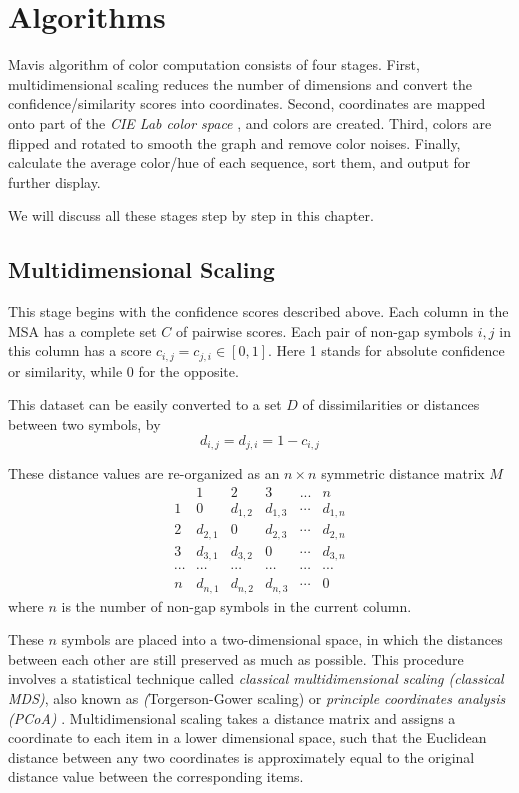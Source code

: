 \chapter{Algorithms}\label{chap:Algorithms}

Mavis algorithm of color computation consists of four stages. First, multidimensional scaling reduces the number of dimensions and convert the confidence/similarity scores into coordinates. Second, coordinates are mapped onto part of the \emph{CIE Lab color space} \cite {McLAREN:1976aa}, and colors are created. Third, colors are flipped and rotated to smooth the graph and remove color noises. Finally, calculate the average color/hue of each sequence, sort them, and output for further display.

We will discuss all these stages step by step in this chapter.

\section{Multidimensional Scaling}

This stage begins with the confidence scores described above. Each column in the MSA has a complete set $C$ of pairwise scores. Each pair of non-gap symbols $i,j$ in this column has a score $c_{i,j}=c_{j,i} \in [0,1]$. Here 1 stands for absolute confidence or similarity, while 0 for the opposite.

This dataset can be easily converted to a set $D$ of dissimilarities or distances between two symbols, by $$d_{i,j}=d_{j,i}=1-c_{i,j}$$

These distance values are re-organized as an $n \times n$ symmetric distance matrix $M$
\[ \begin{array}{cccccc}
            & \mbox{1}  & \mbox{2}  & \mbox{3}  & \mbox{...}  & n       \\
\mbox{1}    & 0         & d_{1,2}   & d_{1,3}   & \cdots      & d_{1,n} \\
\mbox{2}    & d_{2,1}   & 0         & d_{2,3}   & \cdots      & d_{2,n} \\
\mbox{3}    & d_{3,1}   & d_{3,2}   & 0         & \cdots      & d_{3,n} \\
\cdots      & \cdots    & \cdots    & \cdots    & \cdots      & \cdots  \\
n           & d_{n,1}   & d_{n,2}   & d_{n,3}   & \cdots      & 0 \end{array} \]
where $n$ is the number of non-gap symbols in the current column.

These $n$ symbols are placed into a two-dimensional space, in which the distances between each other are still preserved as much as possible. This procedure involves a statistical technique called \emph{classical multidimensional scaling (classical MDS)}, also known as \emph(Torgerson-Gower scaling) or \emph{principle coordinates analysis (PCoA)} \cite{GOWER01121966}. Multidimensional scaling takes a distance matrix and assigns a coordinate to each item in a lower dimensional space, such that the Euclidean distance between any two coordinates is approximately equal to the original distance value between the corresponding items.

